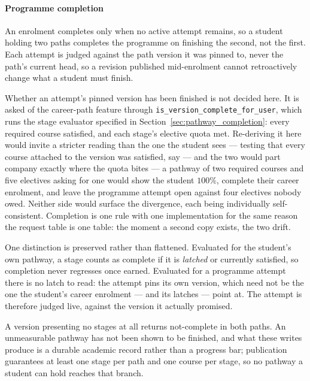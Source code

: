 \paragraph{Programme completion}
An enrolment completes only when no active attempt remains, so a student holding two paths completes the programme on finishing the second, not the first. Each attempt is judged against the path version it was pinned to, never the path's current head, so a revision published mid-enrolment cannot retroactively change what a student must finish.

Whether an attempt's pinned version has been finished is not decided here. It is asked of the career-path feature through \texttt{is\_version\_complete\_for\_user}, which runs the stage evaluator specified in Section~\ref{sec:pathway_completion}: every required course satisfied, and each stage's elective quota met. Re-deriving it here would invite a stricter reading than the one the student sees --- testing that every course attached to the version was satisfied, say --- and the two would part company exactly where the quota bites --- a pathway of two required courses and five electives asking for one would show the student $100\%$, complete their career enrolment, and leave the programme attempt open against four electives nobody owed. Neither side would surface the divergence, each being individually self-consistent. Completion is one rule with one implementation for the same reason the request table is one table: the moment a second copy exists, the two drift.

One distinction is preserved rather than flattened. Evaluated for the student's own pathway, a stage counts as complete if it is \emph{latched} or currently satisfied, so completion never regresses once earned. Evaluated for a programme attempt there is no latch to read: the attempt pins its own version, which need not be the one the student's career enrolment --- and its latches --- point at. The attempt is therefore judged live, against the version it actually promised.

A version presenting no stages at all returns not-complete in both paths. An unmeasurable pathway has not been shown to be finished, and what these writes produce is a durable academic record rather than a progress bar; publication guarantees at least one stage per path and one course per stage, so no pathway a student can hold reaches that branch.

